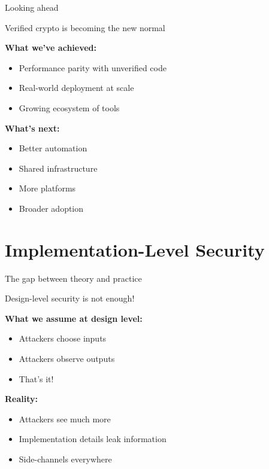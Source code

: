 \documentclass[aspectratio=169, lualatex, handout]{beamer}
\begin{document}
\begin{frame}{Looking ahead}
	\begin{center}
		\Large
		Verified crypto is becoming the new normal
	\end{center}
	\vspace{0.5em}
	\textbf{What we've achieved:}
	\begin{itemize}
		\item Performance parity with unverified code
		\item Real-world deployment at scale
		\item Growing ecosystem of tools
	\end{itemize}
	\vspace{0.5em}
	\textbf{What's next:}
	\begin{itemize}
		\item Better automation
		\item Shared infrastructure
		\item More platforms
		\item Broader adoption
	\end{itemize}
\end{frame}

\section{Implementation-Level Security}

\begin{frame}{The gap between theory and practice}
	\begin{center}
		\Large
		Design-level security is not enough!
	\end{center}
	\vspace{1em}
	\textbf{What we assume at design level:}
	\begin{itemize}
		\item Attackers choose inputs
		\item Attackers observe outputs
		\item That's it!
	\end{itemize}
	\vspace{0.5em}
	\textbf{Reality:}
	\begin{itemize}
		\item Attackers see much more
		\item Implementation details leak information
		\item Side-channels everywhere
	\end{itemize}
\end{frame}
\end{document}
